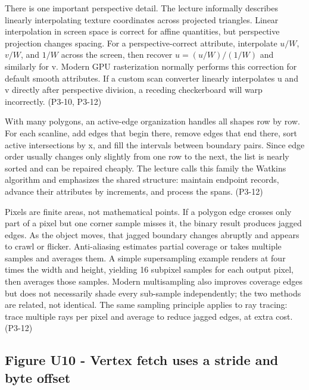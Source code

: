 There is one important perspective detail. The lecture informally describes linearly interpolating texture coordinates across projected triangles. Linear interpolation in screen space is correct for affine quantities, but perspective projection changes spacing. For a perspective-correct attribute, interpolate \(u/W\), \(v/W\), and \(1/W\) across the screen, then recover \(u=(u/W)/(1/W)\) and similarly for v. Modern GPU rasterization normally performs this correction for default smooth attributes. If a custom scan converter linearly interpolates u and v directly after perspective division, a receding checkerboard will warp incorrectly. (P3-10, P3-12)

With many polygons, an active-edge organization handles all shapes row by row. For each scanline, add edges that begin there, remove edges that end there, sort active intersections by x, and fill the intervals between boundary pairs. Since edge order usually changes only slightly from one row to the next, the list is nearly sorted and can be repaired cheaply. The lecture calls this family the Watkins algorithm and emphasizes the shared structure: maintain endpoint records, advance their attributes by increments, and process the spans. (P3-12)

Pixels are finite areas, not mathematical points. If a polygon edge crosses only part of a pixel but one corner sample misses it, the binary result produces jagged edges. As the object moves, that jagged boundary changes abruptly and appears to crawl or flicker. Anti-aliasing estimates partial coverage or takes multiple samples and averages them. A simple supersampling example renders at four times the width and height, yielding 16 subpixel samples for each output pixel, then averages those samples. Modern multisampling also improves coverage edges but does not necessarily shade every sub-sample independently; the two methods are related, not identical. The same sampling principle applies to ray tracing: trace multiple rays per pixel and average to reduce jagged edges, at extra cost. (P3-12)

\subsection{Figure U10 - Vertex fetch uses a stride and byte offset}\label{03-visual-computing-i-ch018-figure-u10---vertex-fetch-uses-a-stride-and-byte-offset}

\hypertarget{03-visual-computing-i-ch018-figure-u10---vertex-fetch-uses-a-stride-and-byte-offset}{}

